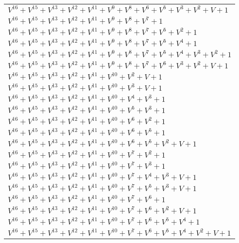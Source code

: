 \documentclass[12pt]{article}
\begin{document}
\begin{adjustwidth}{-4cm}{}
\begin{center}
\begin{longtable}{|l|}
$V^{16}  +V^{15}  +V^{13}  +V^{12}  +V^{11}  +V^{9}  +V^{8}  +V^{6}  +V^{5}  +V^{3}  +V^{2}  + V + 1$ \\
$V^{16}  +V^{15}  +V^{13}  +V^{12}  +V^{11}  +V^{9}  +V^{8}  +V^{7}  + 1$ \\
$V^{16}  +V^{15}  +V^{13}  +V^{12}  +V^{11}  +V^{9}  +V^{8}  +V^{7}  +V^{5}  +V^{2}  + 1$ \\
$V^{16}  +V^{15}  +V^{13}  +V^{12}  +V^{11}  +V^{9}  +V^{8}  +V^{7}  +V^{5}  +V^{4}  + 1$ \\
$V^{16}  +V^{15}  +V^{13}  +V^{12}  +V^{11}  +V^{9}  +V^{8}  +V^{7}  +V^{5}  +V^{4}  +V^{3}  +V^{2}  + 1$ \\
$V^{16}  +V^{15}  +V^{13}  +V^{12}  +V^{11}  +V^{9}  +V^{8}  +V^{7}  +V^{6}  +V^{3}  +V^{2}  + V + 1$ \\
$V^{16}  +V^{15}  +V^{13}  +V^{12}  +V^{11}  +V^{10}  +V^{2}  + V + 1$ \\
$V^{16}  +V^{15}  +V^{13}  +V^{12}  +V^{11}  +V^{10}  +V^{3}  + V + 1$ \\
$V^{16}  +V^{15}  +V^{13}  +V^{12}  +V^{11}  +V^{10}  +V^{4}  +V^{3}  + 1$ \\
$V^{16}  +V^{15}  +V^{13}  +V^{12}  +V^{11}  +V^{10}  +V^{5}  +V^{3}  + 1$ \\
$V^{16}  +V^{15}  +V^{13}  +V^{12}  +V^{11}  +V^{10}  +V^{6}  +V^{2}  + 1$ \\
$V^{16}  +V^{15}  +V^{13}  +V^{12}  +V^{11}  +V^{10}  +V^{6}  +V^{5}  + 1$ \\
$V^{16}  +V^{15}  +V^{13}  +V^{12}  +V^{11}  +V^{10}  +V^{6}  +V^{5}  +V^{2}  + V + 1$ \\
$V^{16}  +V^{15}  +V^{13}  +V^{12}  +V^{11}  +V^{10}  +V^{7}  +V^{2}  + 1$ \\
$V^{16}  +V^{15}  +V^{13}  +V^{12}  +V^{11}  +V^{10}  +V^{7}  +V^{3}  + 1$ \\
$V^{16}  +V^{15}  +V^{13}  +V^{12}  +V^{11}  +V^{10}  +V^{7}  +V^{4}  +V^{3}  + V + 1$ \\
$V^{16}  +V^{15}  +V^{13}  +V^{12}  +V^{11}  +V^{10}  +V^{7}  +V^{5}  +V^{3}  + V + 1$ \\
$V^{16}  +V^{15}  +V^{13}  +V^{12}  +V^{11}  +V^{10}  +V^{7}  +V^{6}  + 1$ \\
$V^{16}  +V^{15}  +V^{13}  +V^{12}  +V^{11}  +V^{10}  +V^{7}  +V^{6}  +V^{2}  + V + 1$ \\
$V^{16}  +V^{15}  +V^{13}  +V^{12}  +V^{11}  +V^{10}  +V^{7}  +V^{6}  +V^{5}  +V^{4}  + 1$ \\
$V^{16}  +V^{15}  +V^{13}  +V^{12}  +V^{11}  +V^{10}  +V^{7}  +V^{6}  +V^{5}  +V^{4}  +V^{2}  + V + 1$ \\

\end{longtable}
\end{center}
\end{adjustwidth}
\end{document}
